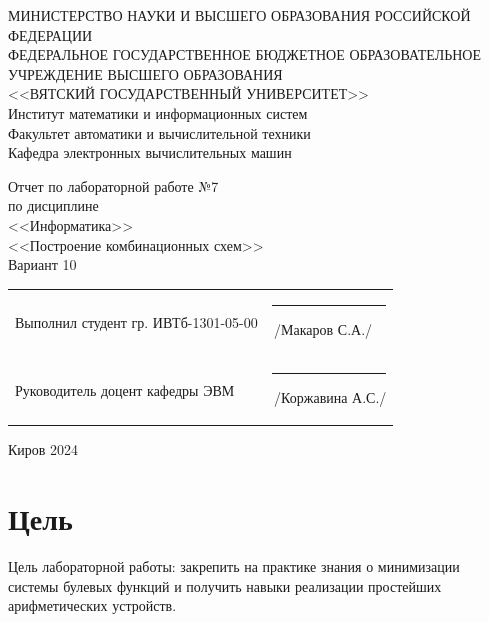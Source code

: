 \documentclass[a4paper,14pt]{extarticle}
\begin{document}
	
	\newpage\thispagestyle{empty}
	\begin{center}
		\MakeUppercase{
			Министерство науки и высшего образования Российской Федерации\\
			Федеральное государственное бюджетное образовательное учреждение высшего образования\\
			<<Вятский Государственный Университет>>\\
		}
		Институт математики и информационных систем\\
		Факультет автоматики и вычислительной техники\\
		Кафедра электронных вычислительных машин
	\end{center}
	\vfill
	
	\begin{center}
		Отчет по лабораторной работе №7\\
		по дисциплине\\
		<<Информатика>>\\
		<<Построение комбинационных схем>>\\
		Вариант 10
	\end{center}
	\vfill
	
	\noindent
	\begin{tabular}{ll}
		Выполнил студент гр. ИВТб-1301-05-00 \hspace{5mm} &
		\rule[-1mm]{25mm}{0.10mm}\,/Макаров С.А./\\
		
		Руководитель доцент кафедры ЭВМ & \rule[-1mm]{25mm}{0.10mm}\,/Коржавина А.С./\\
	\end{tabular}
	
	\vfill
	\begin{center}
		Киров 2024
	\end{center}
	
	\newpage
	\section*{Цель}
	Цель лабораторной работы: закрепить на практике знания о минимизации системы булевых функций и получить навыки реализации простейших арифметических устройств.
	
\end{document}

